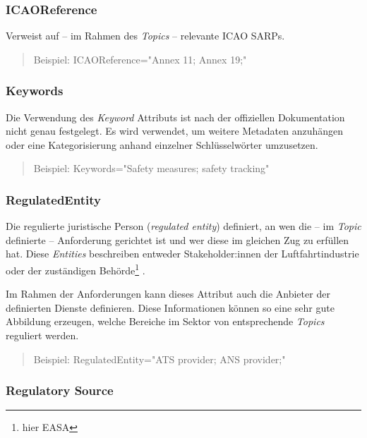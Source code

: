    \subsubsection{ICAOReference}

Verweist auf -- im Rahmen des \textit{Topics} -- relevante \ac{ICAO} \acp{SARP}. 
\cite[23]{easa_xml_doc}

\begin{quote}
    Beispiel:
    \textsf{ICAOReference="{}Annex 11; Annex 19;"}
\end{quote}
    
    \subsubsection{Keywords}

    Die Verwendung des \textit{Keyword} Attributs ist nach der offiziellen Dokumentation nicht genau festgelegt.
    Es wird verwendet, um weitere Metadaten anzuhängen oder eine Kategorisierung anhand einzelner Schlüsselwörter umzusetzen.
\cite[23--26]{easa_xml_doc}
    \begin{quote}
    Beispiel:
    \textsf{Keywords="{}Safety measures; safety tracking"}
\end{quote}

    \subsubsection{RegulatedEntity}

Die regulierte juristische Person (\textit{regulated entity}) definiert, an wen die -- im \textit{Topic} definierte -- Anforderung gerichtet ist und wer diese im gleichen Zug zu erfüllen hat.
Diese \textit{Entities} beschreiben entweder Stakeholder:innen der Luftfahrtindustrie oder der zuständigen Behörde\footnote{hier \ac{EASA}} \cite[26]{easa_xml_doc}.

Im Rahmen der \atmans Anforderungen kann dieses Attribut auch die Anbieter der definierten \atmans Dienste definieren.
Diese Informationen können so eine sehr gute Abbildung erzeugen, welche Bereiche im \atmans Sektor von entsprechende \textit{Topics} reguliert werden.  
    \begin{quote}
    Beispiel:
    \textsf{RegulatedEntity="{}ATS provider; ANS provider;"}
\end{quote}

    
    \subsubsection{Regulatory Source}

